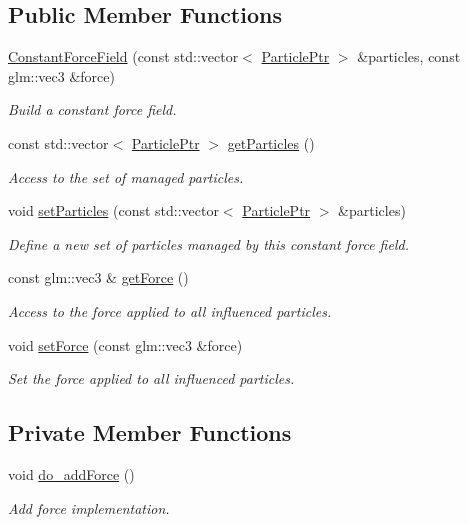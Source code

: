 \subsection*{Public Member Functions}
\begin{DoxyCompactItemize}
\item 
\hyperlink{classConstantForceField_aae2c264a31c790130fc0b76c6e93160b}{Constant\+Force\+Field} (const std\+::vector$<$ \hyperlink{Particle_8hpp_a9a7abc8635002993537b61ef2c857fdd}{Particle\+Ptr} $>$ \&particles, const glm\+::vec3 \&force)
\begin{DoxyCompactList}\small\item\em Build a constant force field. \end{DoxyCompactList}\item 
const std\+::vector$<$ \hyperlink{Particle_8hpp_a9a7abc8635002993537b61ef2c857fdd}{Particle\+Ptr} $>$ \hyperlink{classConstantForceField_a80d7579494fc32b0c83daab452130371}{get\+Particles} ()
\begin{DoxyCompactList}\small\item\em Access to the set of managed particles. \end{DoxyCompactList}\item 
void \hyperlink{classConstantForceField_acd6c41391f38bb37890a7a9f5864e04d}{set\+Particles} (const std\+::vector$<$ \hyperlink{Particle_8hpp_a9a7abc8635002993537b61ef2c857fdd}{Particle\+Ptr} $>$ \&particles)
\begin{DoxyCompactList}\small\item\em Define a new set of particles managed by this constant force field. \end{DoxyCompactList}\item 
const glm\+::vec3 \& \hyperlink{classConstantForceField_a7e914a757101de443694df79f9665586}{get\+Force} ()
\begin{DoxyCompactList}\small\item\em Access to the force applied to all influenced particles. \end{DoxyCompactList}\item 
void \hyperlink{classConstantForceField_a46c997f9f771cc83ef47bfdf6898734a}{set\+Force} (const glm\+::vec3 \&force)
\begin{DoxyCompactList}\small\item\em Set the force applied to all influenced particles. \end{DoxyCompactList}\end{DoxyCompactItemize}
\subsection*{Private Member Functions}
\begin{DoxyCompactItemize}
\item 
void \hyperlink{classConstantForceField_a4336bdbfa85ac10cc8a50170ab515061}{do\+\_\+add\+Force} ()
\begin{DoxyCompactList}\small\item\em Add force implementation. \end{DoxyCompactList}\end{DoxyCompactItemize}
